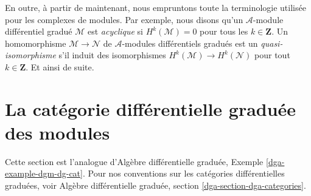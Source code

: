 \medskip\noindent
En outre, à partir de maintenant, nous empruntons toute la terminologie utilisée pour les complexes de modules.
Par exemple, nous disons qu'un $\mathcal{A}$-module différentiel gradué $\mathcal{M}$ est {\it acyclique} si $H^k(\mathcal{M}) = 0$ pour tous les $k \in \mathbf{Z}$.
Un homomorphisme $\mathcal{M} \to \mathcal{N}$ de $\mathcal{A}$-modules différentiels gradués est un {\it quasi-isomorphisme} s'il induit des isomorphismes $H^k(\mathcal{M}) \to H^k(\mathcal{N})$ pour tout $k \in \mathbf{Z}$.
Et ainsi de suite.


















\section{La catégorie différentielle graduée des modules}
\label{section-dgm-dg-cat}

\noindent
Cette section est l'analogue d'Algèbre différentielle graduée, Exemple \ref{dga-example-dgm-dg-cat}.
Pour nos conventions sur les catégories différentielles graduées, voir Algèbre différentielle graduée, section \ref{dga-section-dga-categories}.

